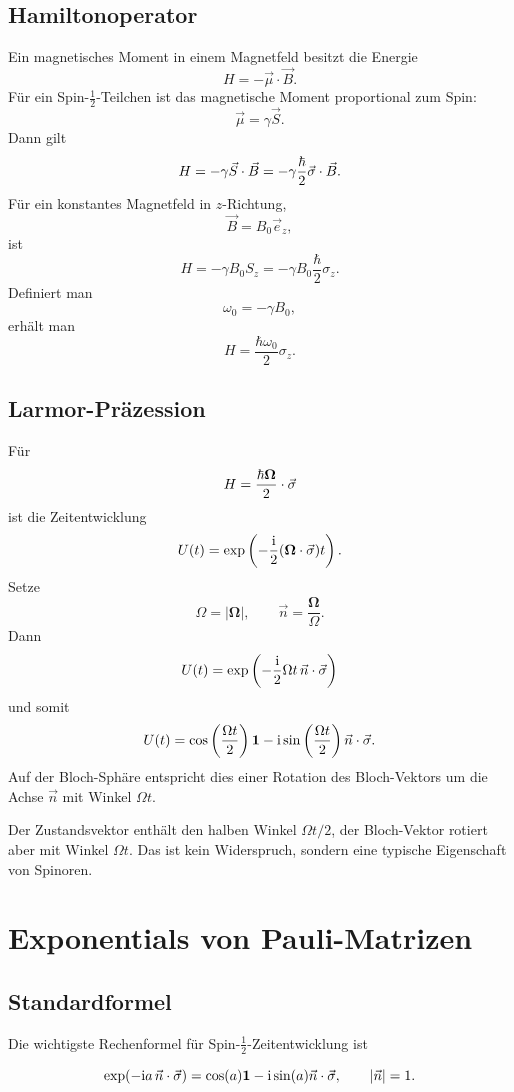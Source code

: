 \subsection{Hamiltonoperator}

Ein magnetisches Moment in einem Magnetfeld besitzt die Energie
\[
    H=-\vec\mu\cdot\vec B.
\]
Für ein Spin-\(\frac12\)-Teilchen ist das magnetische Moment proportional zum Spin:
\[
    \vec\mu=\gamma\vec S.
\]
Dann gilt
\[
    H=-\gamma\vec S\cdot\vec B
    =-\gamma\frac{\hbar}{2}\vec\sigma\cdot\vec B.
\]
Für ein konstantes Magnetfeld in \(z\)-Richtung,
\[
    \vec B=B_0\vec e_z,
\]
ist
\[
    H=-\gamma B_0 S_z
    =-\gamma B_0\frac{\hbar}{2}\sigma_z.
\]
Definiert man
\[
    \omega_0=-\gamma B_0,
\]
erhält man
\[
    H=\frac{\hbar\omega_0}{2}\sigma_z.
\]

\subsection{Larmor-Präzession}

Für
\[
    H=\frac{\hbar\boldsymbol{\Omega}}{2}\cdot\vec\sigma
\]
ist die Zeitentwicklung
\[
    U(t)=\exp\left(-\frac{\mathrm{i}}{2}(\boldsymbol{\Omega}\cdot\vec\sigma)t\right).
\]
Setze
\[
    \Omega=|\boldsymbol{\Omega}|,
    \qquad
    \vec n=\frac{\boldsymbol{\Omega}}{\Omega}.
\]
Dann
\[
    U(t)=\exp\left(-\frac{\mathrm{i}}{2}\Omega t\,\vec n\cdot\vec\sigma\right)
\]
und somit
\[
    U(t)=\cos\left(\frac{\Omega t}{2}\right)\mathbf{1}
    -\mathrm{i}\sin\left(\frac{\Omega t}{2}\right)\vec n\cdot\vec\sigma.
\]
Auf der Bloch-Sphäre entspricht dies einer Rotation des Bloch-Vektors um die Achse \(\vec n\) mit Winkel \(\Omega t\).

\begin{notebox}
Der Zustandsvektor enthält den halben Winkel \(\Omega t/2\), der Bloch-Vektor rotiert aber mit Winkel \(\Omega t\). Das ist kein Widerspruch, sondern eine typische Eigenschaft von Spinoren.
\end{notebox}

\section{Exponentials von Pauli-Matrizen}

\subsection{Standardformel}

Die wichtigste Rechenformel für Spin-\(\frac12\)-Zeitentwicklung ist
\begin{formulabox}
\[
    \exp(-\mathrm{i} a\,\vec n\cdot\vec\sigma)
    =\cos(a)\mathbf{1}-\mathrm{i}\sin(a)\vec n\cdot\vec\sigma,
    \qquad |\vec n|=1.
\]
\end{formulabox}

